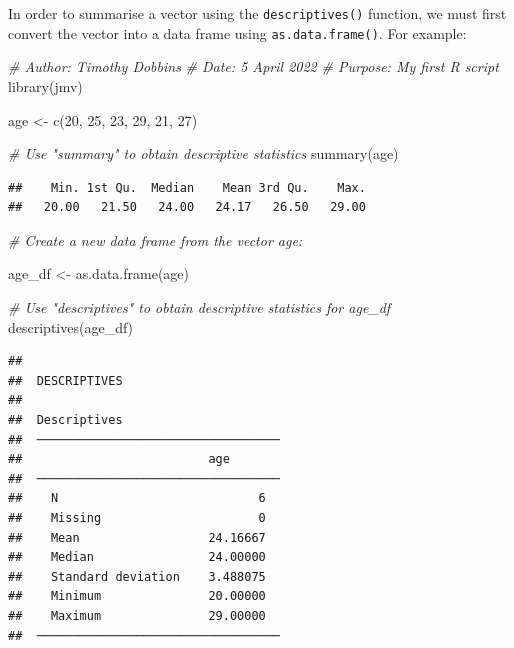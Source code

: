 \documentclass[
]{memoir}
\newenvironment{Shaded}{\begin{snugshade}}{\end{snugshade}}
\newcommand{\CommentTok}[1]{\textcolor[rgb]{0.56,0.35,0.01}{\textit{#1}}}
\newcommand{\DecValTok}[1]{\textcolor[rgb]{0.00,0.00,0.81}{#1}}
\newcommand{\FunctionTok}[1]{\textcolor[rgb]{0.00,0.00,0.00}{#1}}
\newcommand{\NormalTok}[1]{#1}
\newcommand{\OtherTok}[1]{\textcolor[rgb]{0.56,0.35,0.01}{#1}}
\begin{document}
In order to summarise a vector using the \texttt{descriptives()} function, we must first convert the vector into a data frame using \texttt{as.data.frame()}. For example:

\begin{Shaded}
\begin{Highlighting}[]
\CommentTok{\# Author: Timothy Dobbins}
\CommentTok{\# Date: 5 April 2022}
\CommentTok{\# Purpose: My first R script}
\FunctionTok{library}\NormalTok{(jmv)}

\NormalTok{age }\OtherTok{\textless{}{-}} \FunctionTok{c}\NormalTok{(}\DecValTok{20}\NormalTok{, }\DecValTok{25}\NormalTok{, }\DecValTok{23}\NormalTok{, }\DecValTok{29}\NormalTok{, }\DecValTok{21}\NormalTok{, }\DecValTok{27}\NormalTok{)}

\CommentTok{\# Use "summary" to obtain descriptive statistics}
\FunctionTok{summary}\NormalTok{(age)}
\end{Highlighting}
\end{Shaded}

\begin{verbatim}
##    Min. 1st Qu.  Median    Mean 3rd Qu.    Max. 
##   20.00   21.50   24.00   24.17   26.50   29.00
\end{verbatim}

\begin{Shaded}
\begin{Highlighting}[]
\CommentTok{\# Create a new data frame from the vector age:}

\NormalTok{age\_df }\OtherTok{\textless{}{-}} \FunctionTok{as.data.frame}\NormalTok{(age)}

\CommentTok{\# Use "descriptives" to obtain descriptive statistics for age\_df}
\FunctionTok{descriptives}\NormalTok{(age\_df)}
\end{Highlighting}
\end{Shaded}

\begin{verbatim}
## 
##  DESCRIPTIVES
## 
##  Descriptives                       
##  ────────────────────────────────── 
##                          age        
##  ────────────────────────────────── 
##    N                            6   
##    Missing                      0   
##    Mean                  24.16667   
##    Median                24.00000   
##    Standard deviation    3.488075   
##    Minimum               20.00000   
##    Maximum               29.00000   
##  ──────────────────────────────────
\end{verbatim}
\end{document}
